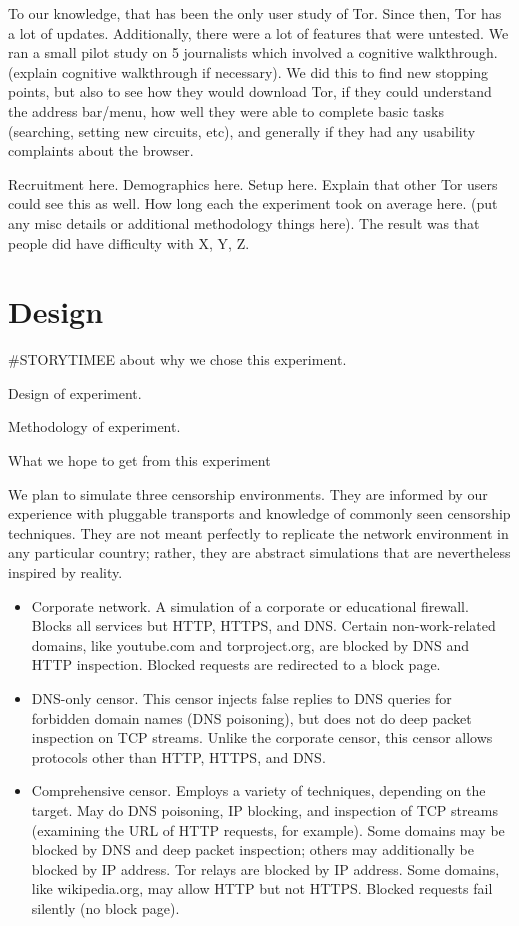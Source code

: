 \documentclass{sig-alternate-hotpets15}
\begin{document}
To our knowledge, that has been the only user study of Tor. Since then, Tor has a lot of updates. Additionally, there were a lot of features that were untested. We ran a small pilot study on 5 journalists which involved a cognitive walkthrough.(explain cognitive walkthrough if necessary). We did this to find new stopping points, but also to see how they would download Tor, if they could understand the address bar/menu, how well they were able to complete basic tasks (searching, setting new circuits, etc), and generally if they had any usability complaints about the browser. 

Recruitment here. Demographics here. Setup here. Explain that other Tor users could see this as well. How long each the experiment took on average here. (put any misc details or additional methodology things here). The result was that people did have difficulty with X, Y, Z.

\section{Design}
\#STORYTIMEE  about why we chose this experiment. 

Design of experiment. 

Methodology of experiment. 

What we hope to get from this experiment

We plan to simulate three censorship environments.
They are informed by our experience with pluggable transports
and knowledge of commonly seen censorship techniques.
They are not meant perfectly to replicate the network environment
in any particular country; rather, they are abstract simulations
that are nevertheless inspired by reality.

\begin{itemize}
\item{Corporate network.}
A simulation of a corporate or educational firewall.
Blocks all services but HTTP, HTTPS, and DNS.
Certain non-work-related domains, like youtube.com and torproject.org,
are blocked by DNS and HTTP inspection.
Blocked requests are redirected to a block page.
\item{DNS-only censor.}
This censor injects false replies to DNS queries
for forbidden domain names (DNS poisoning),
but does not do deep packet inspection on TCP streams.
Unlike the corporate censor, this censor allows protocols
other than HTTP, HTTPS, and DNS.
\item{Comprehensive censor.}
Employs a variety of techniques, depending on the target.
May do DNS poisoning, IP blocking, and inspection of TCP streams
(examining the URL of HTTP requests, for example).
Some domains may be blocked by DNS and deep packet inspection;
others may additionally be blocked by IP address.
Tor relays are blocked by IP address.
Some domains, like wikipedia.org, may allow HTTP but not HTTPS.
Blocked requests fail silently (no block page).
\end{itemize}
\end{document}
